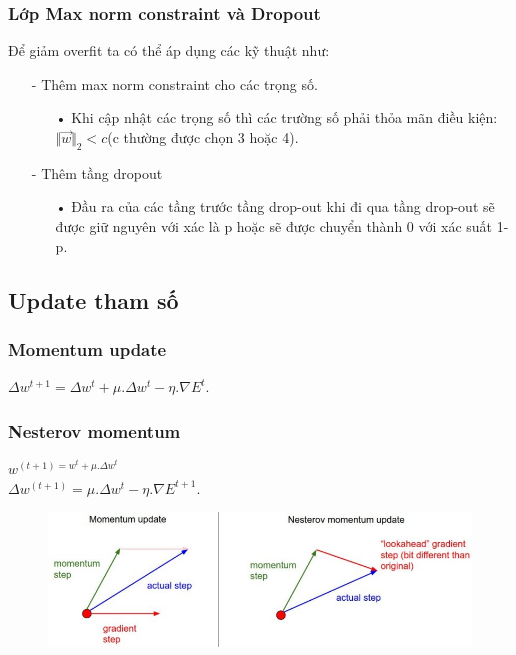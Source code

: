 \documentclass[a4paper,12pt]{report}
\begin{document}
\subsubsection{Lớp Max norm constraint và Dropout}
Để giảm overfit ta có thể áp dụng các kỹ thuật như:
\begin{itemize}
\item[-] Thêm max norm constraint cho các trọng số.
\begin{itemize}
\item[•] Khi cập nhật các trọng số thì các trường số phải thỏa mãn điều kiện: \\ 
 $\Vert\overrightarrow{w}\Vert_{2} < c$(c thường được chọn 3 hoặc 4). 
\end{itemize}
\item[-] Thêm tầng dropout
\begin{itemize}
\item[•] Đầu ra của các tầng trước tầng drop-out khi đi qua tầng drop-out sẽ được giữ nguyên với xác là p hoặc sẽ được chuyển thành 0 với xác suất 1-p.
\end{itemize} 
\end{itemize}
\subsection{Update tham số}
\subsubsection{Momentum update}
$\Delta w^{t+1} = \Delta w^{t} + \mu .\Delta w^{t} - \eta . \nabla E^t$.
\subsubsection{Nesterov momentum}
$w^{(t+1) = w^{t} + \mu . \Delta w^t}$ \\
$\Delta w^{(t+1)} = \mu . \Delta w^t - \eta . \nabla E^{t+1}$.
\begin{figure}[h]
\begin{center}
\includegraphics[width =0.8 \textwidth]{paramUpdate.jpeg}
\end{center}
\end{figure}
\end{document}
